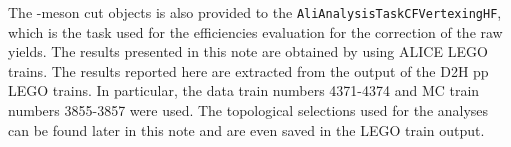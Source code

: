 The \Dstar -meson cut objects is also provided to the \texttt{AliAnalysisTaskCFVertexingHF}, which is the task used for the efficiencies evaluation for the correction of the raw yields. The results presented in this note are obtained by using ALICE LEGO trains. The results reported here are extracted from the output of the D2H pp LEGO trains. In particular, the data train numbers 4371-4374 and MC train numbers 3855-3857 were used. The topological selections used for the analyses can be found later in this note and are even saved in the LEGO train output.



\newpage
